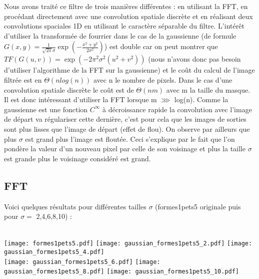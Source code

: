 \documentclass[12pt]{article}
\numberwithin{equation}{section}
\begin{document}
Nous avons traité ce filtre de trois manières différentes : en utilisant la FFT, en procédant directement avec une convolution spatiale discrète et en réalisant deux convolutions spaciales 1D en utilisant le caractère séparable du filtre. L'intérêt d'utiliser la transformée de fourrier dans le cas de la gaussienne (de formule $G(x,y) = \frac{1}{\sqrt{2\pi }\sigma}\exp({-\frac{x^2 + y^2}{2\sigma^2}})$) est double car on peut montrer que $TF(G(u,v)) = \exp({-2\pi^2 \sigma^2(u^2 + v^2)})$ (nous n'avons donc pas besoin d'utiliser l'algorithme de la FFT sur la gaussienne) et le coût du calcul de l'image filtrée est en $\Theta(nlog(n))$ avec n le nombre de pixels. Dans le cas d'une convolution spatiale discrète le coût est de $\Theta(nm)$ avec m la taille du masque. Il est donc intéressant d'utiliser la FFT lorsque m $\ggg $ log(n). 
Comme la gaussienne est une fonction $C^\infty$ à décroissance rapide la convolution avec l'image de départ va régulariser cette dernière, c'est pour cela que les images de sorties sont plus lisses que l'image de départ (effet de flou). On observe par ailleurs que plus $\sigma$ est grand plus l'image est floutée. Ceci s'explique par le fait que l'on pondère la valeur d'un nouveau pixel par celle de son voisinage et plus la taille $\sigma$ est grande plus le voisinage considéré est grand.

\subsection{FFT}
Voici quelques résultats pour différentes tailles $\sigma$ (formes1pets5 originale puis pour $\sigma =$ 2,4,6,8,10) : \\\\
\begin{center}
\texttt{[image: formes1pets5.pdf]}
\texttt{[image: gaussian\_formes1pets5\_2.pdf]}
\texttt{[image: gaussian\_formes1pets5\_4.pdf]}\\
\texttt{[image: gaussian\_formes1pets5\_6.pdf]}
\texttt{[image: gaussian\_formes1pets5\_8.pdf]}
\texttt{[image: gaussian\_formes1pets5\_10.pdf]}
\end{center}
\end{document}
